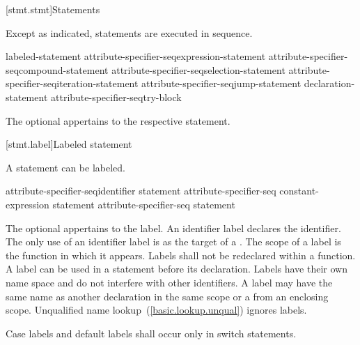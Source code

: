 [stmt.stmt]{Statements}%



\pnum
Except as indicated, statements are executed in sequence.

\begin{bnf}
\br
    labeled-statement\br
    attribute-specifier-seq\opt expression-statement\br
    attribute-specifier-seq\opt compound-statement\br
    attribute-specifier-seq\opt selection-statement\br
    attribute-specifier-seq\opt iteration-statement\br
    attribute-specifier-seq\opt jump-statement\br
    declaration-statement\br
    attribute-specifier-seq\opt try-block
\end{bnf}

The optional  appertains to the respective statement.

[stmt.label]{Labeled statement}%

\pnum
{}%
%
A statement can be labeled.

\begin{bnf}
\br
    attribute-specifier-seq\opt identifier \terminal{:} statement\br
    attribute-specifier-seq\opt {} constant-expression \terminal{:} statement\br
    attribute-specifier-seq\opt {} statement
\end{bnf}

The optional  appertains to the label. An identifier label declares the identifier. The only use of an
identifier label is as the target of a
%
.
%
The scope of a label is the function in which it appears. Labels shall
not be redeclared within a function. A label can be used in a
 statement before its declaration.
%
Labels have their own name space and do not interfere with other
identifiers.
\enternote
A label may have the same name as another declaration in the same scope or a
 from an enclosing scope. Unqualified name
lookup~(\ref{basic.lookup.unqual}) ignores labels.
\exitnote

\pnum
{}%
%
Case labels and default labels shall occur only in switch statements.



